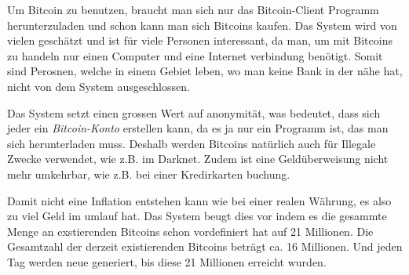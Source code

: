 \noindent
Um Bitcoin zu benutzen, braucht man sich nur das Bitcoin-Client Programm herunterzuladen und schon kann man sich Bitcoins kaufen. Das System wird von
vielen geschätzt und ist für viele Personen interessant, da man, um mit Bitcoins zu handeln nur einen Computer und eine Internet verbindung benötigt.
Somit sind Perosnen, welche in einem Gebiet leben, wo man keine Bank in der nähe hat, nicht von dem System ausgeschlossen.

\noindent
Das System setzt einen grossen Wert auf anonymität, was bedeutet, dass sich jeder ein \emph{\dq Bitcoin-Konto \dq} erstellen kann, da es ja nur ein
Programm ist, das man sich herunterladen muss. Deshalb werden Bitcoins natürlich auch für Illegale Zwecke verwendet, wie z.B. im Darknet. Zudem ist eine
Geldüberweisung nicht mehr umkehrbar, wie z.B. bei einer Kredirkarten buchung.

\noindent
Damit nicht eine Inflation entstehen kann wie bei einer realen Währung, es also zu viel Geld im umlauf hat. Das System beugt dies vor indem es die gesammte Menge
an exstierenden Bitcoins schon vordefiniert hat auf 21 Millionen. Die Gesamtzahl der derzeit existierenden Bitcoins beträgt ca. 16 Millionen. Und jeden Tag werden
neue generiert, bis diese 21 Millionen erreicht wurden.



\newpage
